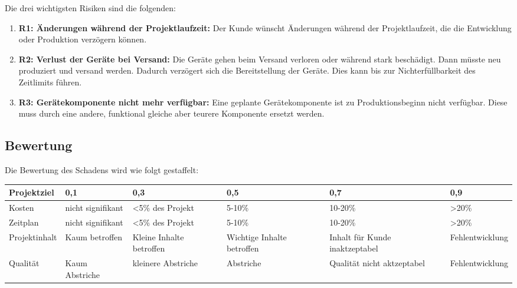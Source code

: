 Die drei wichtigsten Risiken sind die folgenden:
\begin{enumerate}
	\item \textbf{R1: Änderungen während der Projektlaufzeit:} Der Kunde wünscht Änderungen während der Projektlaufzeit, die die Entwicklung oder Produktion verzögern können.
 	\item \textbf{R2: Verlust der Geräte bei Versand:} Die Geräte gehen beim Versand verloren oder während stark beschädigt. Dann müsste neu produziert und versand werden. Dadurch verzögert sich die Bereitstellung der Geräte. Dies kann bis zur Nichterfüllbarkeit des Zeitlimits führen.
	\item \textbf{R3: Gerätekomponente nicht mehr verfügbar:} Eine geplante Gerätekomponente ist zu Produktionsbeginn nicht verfügbar. Diese muss durch eine andere, funktional gleiche aber teurere Komponente ersetzt werden.
\end{enumerate}


\subsection{Bewertung }
Die Bewertung des Schadens wird wie folgt gestaffelt:	
\begin{table}[H]
	    \renewcommand{\arraystretch}{1.2}
	\begin{center}
	\begin{tabular}{p{2.2cm}|p{2cm}|p{2cm}|p{2cm}|p{2cm}|l}
		
		Projektziel & 0,1 & 0,3 & 0,5 & 0,7 & 0,9 \\\hline
		Kosten & nicht signifikant & \textless{}5\% des Projekt & 5-10\% & 10-20\% & \textgreater{}20\% \\\hline
		Zeitplan & nicht signifikant & \textless{}5\% des Projekt & 5-10\% & 10-20\% & \textgreater{}20\% \\\hline
		Projektinhalt & Kaum betroffen & Kleine Inhalte betroffen & Wichtige Inhalte betroffen & Inhalt für Kunde inaktzeptabel & Fehlentwicklung \\\hline
		Qualität & Kaum Abstriche & kleinere Abstriche & Abstriche & Qualität nicht aktzeptabel & Fehlentwicklung
	\end{tabular}
\end{center}
\end{table}

